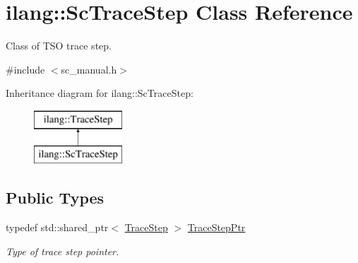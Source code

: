 \hypertarget{classilang_1_1_sc_trace_step}{}\section{ilang\+:\+:Sc\+Trace\+Step Class Reference}
\label{classilang_1_1_sc_trace_step}


Class of T\+SO trace step.  




{\ttfamily \#include $<$sc\+\_\+manual.\+h$>$}

Inheritance diagram for ilang\+:\+:Sc\+Trace\+Step\+:\begin{figure}[H]
\begin{center}
\leavevmode
\includegraphics[height=2.000000cm]{classilang_1_1_sc_trace_step}
\end{center}
\end{figure}
\subsection*{Public Types}
\begin{DoxyCompactItemize}
\item 
\mbox{\label{classilang_1_1_sc_trace_step_ac62171a8d06baf2bf0941f9e040c27b9}} 
typedef std\+::shared\+\_\+ptr$<$ \mbox{\hyperlink{classilang_1_1_trace_step}{Trace\+Step}} $>$ \mbox{\hyperlink{classilang_1_1_sc_trace_step_ac62171a8d06baf2bf0941f9e040c27b9}{Trace\+Step\+Ptr}}
\begin{DoxyCompactList}\small\item\em Type of trace step pointer. \end{DoxyCompactList}\end{DoxyCompactItemize}
